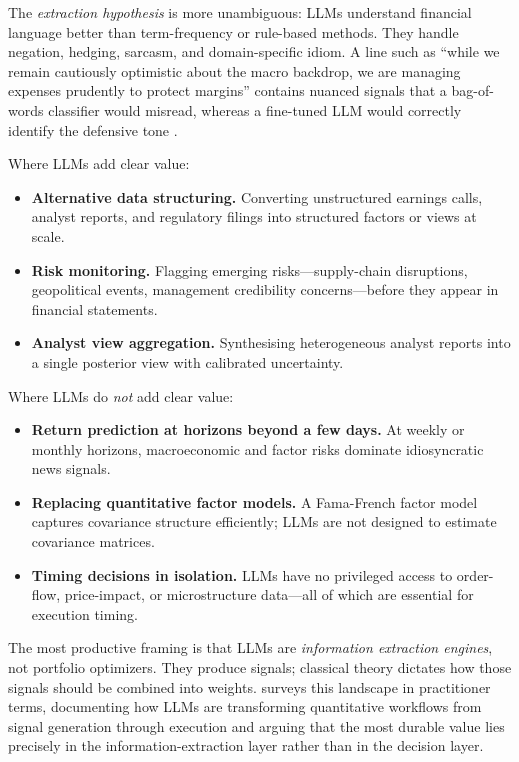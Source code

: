 The \emph{extraction hypothesis} is more unambiguous: LLMs understand financial language
better than term-frequency or rule-based methods. They handle negation, hedging, sarcasm,
and domain-specific idiom. A line such as ``while we remain cautiously optimistic about
the macro backdrop, we are managing expenses prudently to protect margins'' contains
nuanced signals that a bag-of-words classifier would misread, whereas a fine-tuned LLM
would correctly identify the defensive tone \citep{araci2019finbert}.

Where LLMs add clear value:
\begin{itemize}
  \item \textbf{Alternative data structuring.} Converting unstructured earnings calls,
    analyst reports, and regulatory filings into structured factors or views at scale.
  \item \textbf{Risk monitoring.} Flagging emerging risks---supply-chain disruptions,
    geopolitical events, management credibility concerns---before they appear in financial
    statements.
  \item \textbf{Analyst view aggregation.} Synthesising heterogeneous analyst
    reports into a single posterior view with calibrated uncertainty.
\end{itemize}

Where LLMs do \emph{not} add clear value:
\begin{itemize}
  \item \textbf{Return prediction at horizons beyond a few days.} At weekly or monthly
    horizons, macroeconomic and factor risks dominate idiosyncratic news signals.
  \item \textbf{Replacing quantitative factor models.} A Fama-French factor model
    captures covariance structure efficiently; LLMs are not designed to estimate
    covariance matrices.
  \item \textbf{Timing decisions in isolation.} LLMs have no privileged access to
    order-flow, price-impact, or microstructure data---all of which are essential for
    execution timing.
\end{itemize}

The most productive framing is that LLMs are \emph{information extraction engines}, not
portfolio optimizers. They produce signals; classical theory dictates how those signals
should be combined into weights. \citet{Mann2024} surveys this landscape in practitioner
terms, documenting how LLMs are transforming quantitative workflows from signal generation
through execution and arguing that the most durable value lies precisely in the
information-extraction layer rather than in the decision layer.

